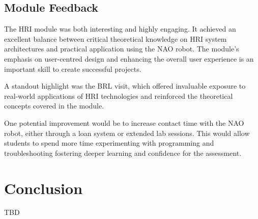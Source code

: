 \documentclass[conference]{IEEEtran}
\begin{document}
\subsection{Module Feedback} The HRI module was both interesting and highly engaging. It achieved an excellent balance between critical theoretical knowledge on HRI system architectures and practical application using the NAO robot. The module’s emphasis on user-centred design and enhancing the overall user experience is an important skill to create successful projects.

A standout highlight was the BRL visit, which offered invaluable exposure to real-world applications of HRI technologies and reinforced the theoretical concepts covered in the module.

One potential improvement would be to increase contact time with the NAO robot, either through a loan system or extended lab sessions. This would allow students to spend more time experimenting with programming and troubleshooting fostering deeper learning and confidence for the assessment.



\section{Conclusion}

TBD



\end{document}
